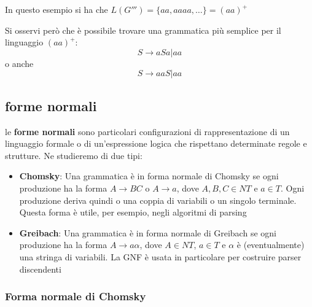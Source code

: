 In questo esempio si ha che $L(G''') = \{aa,aaaa, \dots\} = (aa)^+$

Si osservi però che è possibile trovare una grammatica più semplice per il linguaggio $ (aa)^+$:
\[
        S\to aSa | aa 
\]
o anche 
\[
    S\to aaS|aa    
\]

\subsection{forme normali}
le \textbf{forme normali} sono particolari configurazioni di rappresentazione di un linguaggio formale o di un'espressione logica che rispettano determinate regole e strutture. Ne studieremo di due tipi:
\begin{itemize}
    \item \textbf{Chomsky}: Una grammatica è in forma normale di Chomsky se ogni produzione ha la forma $A\to BC$ o $A\to a$, dove $A, B,C\in NT$ e $a\in T$. Ogni produzione deriva quindi o una coppia di variabili o un singolo terminale. Questa forma è utile, per esempio, negli algoritmi di parsing
    \item \textbf{Greibach}: Una grammatica è in forma normale di Greibach se ogni produzione ha la forma $A\to a\alpha$, dove $A\in NT$, $a\in T$ e $\alpha$ è (eventualmente) una stringa di variabili. La GNF è usata in particolare per costruire parser discendenti
\end{itemize}
\subsubsection{Forma normale di Chomsky}

